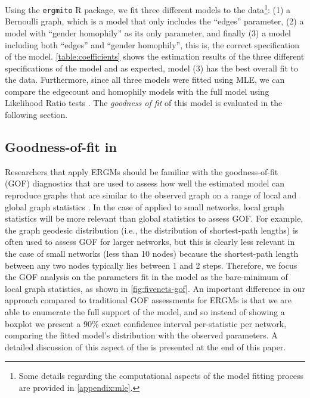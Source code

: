 \documentclass[12pt]{article}
\begin{document}
Using the \texttt{ergmito} R package, we fit three different models to the data\footnote{Some details regarding the computational aspects of the model fitting process are provided in \ref{appendix:mle}.}: (1) a Bernoulli graph, which is a model that only includes the ``edges'' parameter, (2) a model with ``gender homophily'' as its only parameter, and finally (3) a model including both ``edges'' and ``gender homophily'', this is, the correct specification of the model. \autoref{table:coefficients} shows the estimation results of the three different specifications of the model and as expected, model (3) has the best overall fit to the data. Furthermore, since all three models were fitted using MLE, we can compare the edgecount and homophily models with the full model using Likelihood Ratio tests \cite{Zeileis2002}. The \textit{goodness of fit} of this model is evaluated in the following section.




\subsection{Goodness-of-fit in \ergmitos}

Researchers that apply ERGMs should be familiar with the goodness-of-fit (GOF) diagnostics that are used to assess how well the estimated model can reproduce graphs that are similar to the observed graph on a range of local and global graph statistics \cite{Hunteretal2008}. In the case of \ergmitos{} applied to small networks, local graph statistics will be more relevant than global statistics to assess GOF. For example, the graph geodesic distribution (i.e., the distribution of shortest-path lengths) is often used to assess GOF for larger networks, but this is clearly less relevant in the case of small networks (less than 10 nodes) because the shortest-path length between any two nodes typically lies between 1 and 2 steps. Therefore, we focus the GOF analysis on the parameters fit in the model as the bare-minimum of local graph statistics, as shown in \autoref{fig:fivenets-gof}. An important difference in our approach compared to traditional GOF assessments for ERGMs is that we are able to enumerate the full support of the model, and so instead of showing a boxplot we present a 90\% exact confidence interval per-statistic per network, comparing the fitted model's distribution with the observed parameters. A detailed discussion of this aspect of the \ergmitos{} is presented at the end of this paper.
\end{document}
